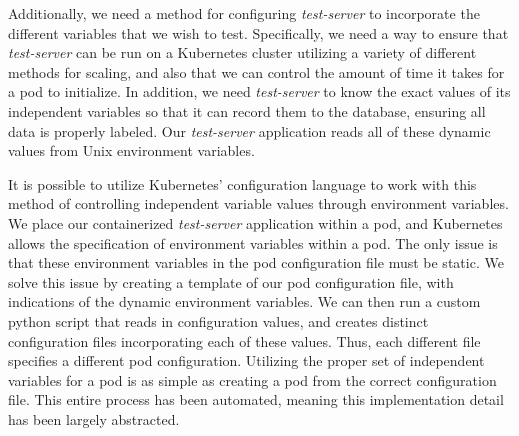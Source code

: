 Additionally, we need a method for configuring
\textit{test-server} to incorporate the different variables that we wish to
test. Specifically, we need a way to ensure that \textit{test-server} can be run
on a Kubernetes cluster utilizing a variety of different methods for scaling,
and also that we can control the amount of time it takes for a pod to
initialize. In addition, we need \textit{test-server} to know the exact values
of its independent variables so that it can record them to the database,
ensuring all data is properly labeled. Our \textit{test-server} application
reads all of these dynamic values from Unix environment variables.

It is possible to utilize Kubernetes' configuration language to work with this
method of controlling independent variable values through environment variables.
We place our containerized \textit{test-server} application within a pod, and
Kubernetes allows the specification of environment variables within a pod. The
only issue is that these environment variables in the pod configuration file
must be static. We solve this issue by creating a template of our pod
configuration file, with indications of the dynamic environment variables. We
can then run a custom python script that reads in configuration values, and creates
distinct configuration files incorporating each of these values. Thus, each
different file specifies a different pod configuration. Utilizing the proper
set of independent variables for a pod is as simple as creating a pod from the
correct configuration file. This entire process has been automated, meaning this
implementation detail has been largely abstracted.

